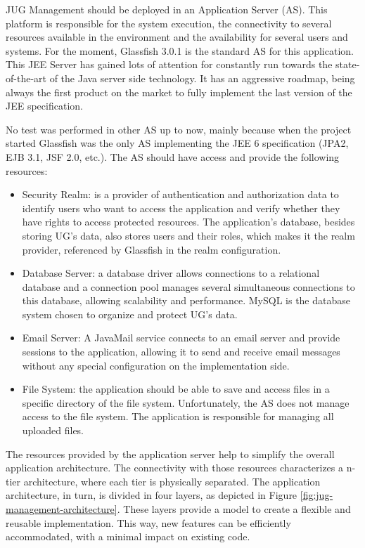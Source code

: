 \documentclass[10pt,a4paper]{report}
\begin{document}
JUG Management should be deployed in an Application Server (AS). This platform is responsible for the system execution, the connectivity to several resources available in the environment and the availability for several users and systems. For the moment, Glassfish 3.0.1 is the standard AS for this application. This JEE Server has gained lots of attention for constantly run towards the state-of-the-art of the Java server side technology. It has an aggressive roadmap, being always the first product on the market to fully implement the last version of the JEE specification.

No test was performed in other AS up to now, mainly because when the project started Glassfish was the only AS implementing the JEE 6 specification (JPA2, EJB 3.1, JSF 2.0, etc.). The AS should have access and provide the following resources:

\begin{itemize}
\item Security Realm: is a provider of authentication and authorization data to identify users who want to access the application and verify whether they have rights to access protected resources.  The application's database, besides storing UG's data, also stores users and their roles, which makes it the realm provider, referenced by Glassfish in the realm configuration.
\item Database Server: a database driver allows connections to a relational database and a connection pool manages several simultaneous connections to this database, allowing scalability and performance. MySQL is the database system chosen to organize and protect UG's data.
\item Email Server: A JavaMail service connects to an email server and provide sessions to the application, allowing it to send and receive email messages without any special configuration on the implementation side.
\item File System: the application should be able to save and access files in a specific directory of the file system. Unfortunately, the AS does not manage access to the file system. The application is responsible for managing all uploaded files.
\end{itemize}

The resources provided by the application server help to simplify the overall application architecture. The connectivity with those resources characterizes a n-tier architecture, where each tier is physically separated. The application architecture, in turn, is divided in four layers, as depicted in Figure \ref{fig:jug-management-architecture}. These layers provide a model to create a flexible and reusable implementation. This way, new features can be efficiently accommodated, with a minimal impact on existing code.
\end{document}
